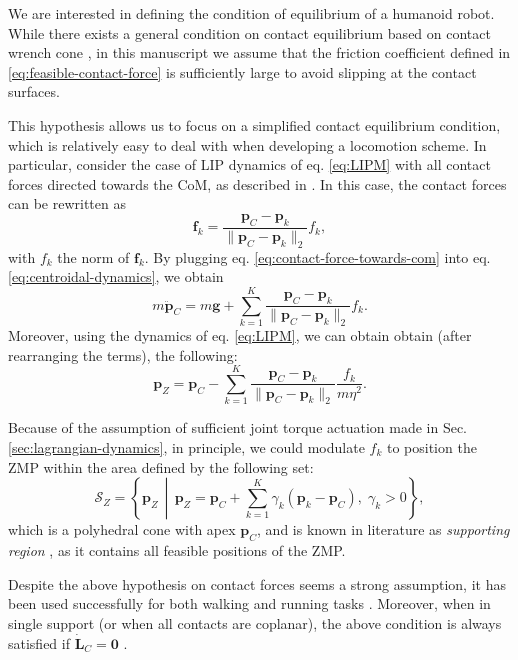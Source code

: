 We are interested in defining the condition of equilibrium of a humanoid robot.
While there exists a general condition on contact
equilibrium based on contact wrench cone \cite{Caron2015RSS}, in this manuscript
we assume that the friction coefficient defined in
\eqref{eq:feasible-contact-force} is sufficiently large to avoid slipping at the
contact surfaces.

This hypothesis allows us to focus on a simplified contact equilibrium
condition, which is relatively easy to deal with when developing a locomotion
scheme. In particular, consider the case of LIP dynamics of eq. \eqref{eq:LIPM}
with all contact forces directed towards the CoM, as described in
\cite{Sugihara2002ICRA}.
In this case, the contact forces can be rewritten as
\begin{equation}
    \label{eq:contact-force-towards-com}
    \bm{f}_k = \frac{\bm{p}_C - \bm{p}_k}{\| \bm{p}_C - \bm{p}_k \|_2} f_k,
\end{equation}
with $f_k$ the norm of $\bm{f}_k$. By plugging eq.
\eqref{eq:contact-force-towards-com} into eq.
\eqref{eq:centroidal-dynamics}, we obtain
\begin{equation}
    m \ddot{\bm{p}}_C = m \bm{g} + \sum_{k=1}^K \frac{\bm{p}_C - \bm{p}_k}{\| \bm{p}_C - \bm{p}_k \|_2} f_k.
\end{equation}
Moreover, using the dynamics of eq. \eqref{eq:LIPM}, we can obtain
obtain (after rearranging the terms), the following:
\begin{equation*}
    \bm{p}_Z = \bm{p}_C - \sum_{k=1}^K \frac{\bm{p}_C - \bm{p}_k}{\| \bm{p}_C - \bm{p}_k \|_2} \frac{f_k}{m \eta^2}.
\end{equation*}

Because of the assumption of sufficient joint torque actuation made in Sec.
\ref{sec:lagrangian-dynamics}, in principle, we could modulate $f_k$ to position
the ZMP within the area defined by the following set:
\begin{equation}
    \mathcal{S}_Z = \left\{ \bm{p}_Z \,\middle\vert\, \bm{p}_Z = \bm{p}_C + \sum_{k=1}^K \gamma_k (\bm{p}_k - \bm{p}_C), \; \gamma_k > 0  \right\},
\end{equation}
which is a polyhedral cone with apex $\bm{p}_C$, and
is known in literature as \textit{supporting region} \cite{Sugihara2021ICRA},
as it contains all feasible positions of the ZMP.

Despite the above hypothesis on contact forces seems a strong assumption, it
has been used successfully for both walking and running tasks
\cite{Sugihara2002ICRA,Zamparelli2018SYROCO,Sugihara2021ICRA,Smaldone2022Running}. Moreover, when in
single support (or when all contacts are coplanar), the above condition is
always satisfied if $\dot{\bm{L}}_C=\bm{0}$
\cite{Caron2017DynamicWalkingOverRoughTerrains}.